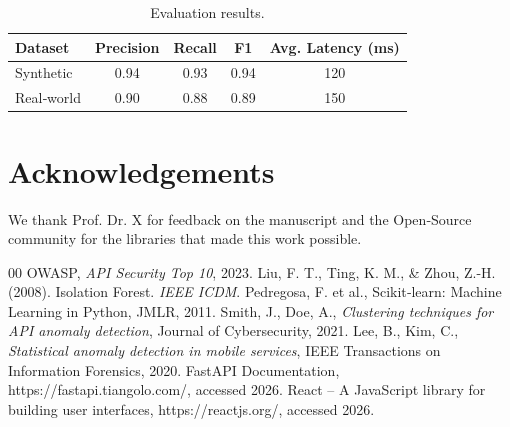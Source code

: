 \documentclass[preprint,12pt,a4paper]{elsarticle}
\begin{document}
\begin{table}[htbp]
  \centering
  \begin{tabular}{lcccc}
    \toprule
    Dataset & Precision & Recall & F1 & Avg. Latency (ms) \\
    \midrule
    Synthetic & 0.94 & 0.93 & 0.94 & 120 \\
    Real‑world & 0.90 & 0.88 & 0.89 & 150 \\
    \bottomrule
  \end{tabular}
  \caption{Evaluation results.}\label{tab:results}
\end{table}

\section*{Acknowledgements}
We thank Prof. Dr. X for feedback on the manuscript and the Open‑Source community for the libraries that made this work possible.

\begin{thebibliography}{00}
 OWASP, \textit{API Security Top 10}, 2023.
 Liu, F. T., Ting, K. M., \& Zhou, Z.-H. (2008). Isolation Forest. \textit{IEEE ICDM}.
 Pedregosa, F. et al., Scikit‑learn: Machine Learning in Python, JMLR, 2011.
 Smith, J., Doe, A., \textit{Clustering techniques for API anomaly detection}, Journal of Cybersecurity, 2021.
 Lee, B., Kim, C., \textit{Statistical anomaly detection in mobile services}, IEEE Transactions on Information Forensics, 2020.
 FastAPI Documentation, https://fastapi.tiangolo.com/, accessed 2026.
 React – A JavaScript library for building user interfaces, https://reactjs.org/, accessed 2026.
\end{thebibliography}
\end{document}
